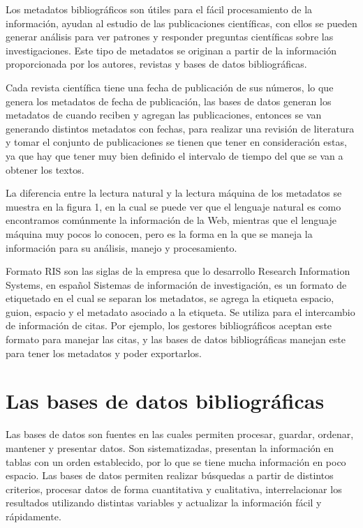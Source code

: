 \documentclass[../Main.tex]{subfiles}
\begin{document}
\smallskip
Los metadatos bibliográficos son útiles para el fácil procesamiento de la información, ayudan al estudio de las publicaciones científicas, con ellos se pueden generar análisis para ver patrones y responder preguntas científicas sobre las investigaciones. Este tipo de metadatos se originan a partir de la información proporcionada por los autores, revistas y bases de datos bibliográficas.

\smallskip
Cada revista científica tiene una fecha de publicación de sus números, lo que genera los metadatos de fecha de publicación, las bases de datos generan los metadatos de cuando reciben y agregan las publicaciones, entonces se van generando distintos metadatos con fechas, para realizar una revisión de literatura y tomar el conjunto de publicaciones se tienen que tener en consideración estas, ya que hay que tener muy bien definido el intervalo de tiempo del que se van a obtener los textos.

\smallskip
La diferencia entre la lectura natural y la lectura máquina de los metadatos se muestra en la figura 1, en la cual se puede ver que el lenguaje natural es como encontramos comúnmente la información de la Web, mientras que el lenguaje máquina muy pocos lo conocen, pero es la forma en la que se maneja la información para su análisis, manejo y procesamiento. 

\smallskip  
Formato RIS son las siglas de la empresa que lo desarrollo Research Information Systems, en español Sistemas de información de investigación, es un formato de etiquetado en el cual se separan los metadatos, se agrega la etiqueta espacio, guion, espacio y el metadato asociado a la etiqueta. Se utiliza para el intercambio de información de citas. Por ejemplo, los gestores bibliográficos aceptan este formato para manejar las citas, y las bases de datos bibliográficas manejan este para tener los metadatos y poder exportarlos.

\section{Las bases de datos bibliográficas}
\noindent
Las bases de datos son fuentes en las cuales permiten procesar, guardar, ordenar, mantener y presentar datos. Son sistematizadas, presentan la información en tablas con un orden establecido, por lo que se tiene mucha información en poco espacio. Las bases de datos permiten realizar búsquedas a partir de distintos criterios, procesar datos de forma cuantitativa y cualitativa, interrelacionar los resultados utilizando distintas variables y actualizar la información fácil y rápidamente.
\end{document}
